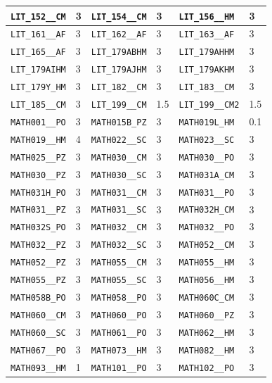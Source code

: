 \begin{longtable}{|l|l||l|l||l|l|}
    \verb|LIT_152__CM| & 3 & \verb|LIT_154__CM| & 3 & \verb|LIT_156__HM| & 3\\\hline
    \verb|LIT_161__AF| & 3 & \verb|LIT_162__AF| & 3 & \verb|LIT_163__AF| & 3\\\hline
    \verb|LIT_165__AF| & 3 & \verb|LIT_179ABHM| & 3 & \verb|LIT_179AHHM| & 3\\\hline
    \verb|LIT_179AIHM| & 3 & \verb|LIT_179AJHM| & 3 & \verb|LIT_179AKHM| & 3\\\hline
    \verb|LIT_179Y_HM| & 3 & \verb|LIT_182__CM| & 3 & \verb|LIT_183__CM| & 3\\\hline
    \verb|LIT_185__CM| & 3 & \verb|LIT_199__CM| & 1.5 & \verb|LIT_199__CM2| & 1.5\\\hline
    \verb|MATH001__PO| & 3 & \verb|MATH015B_PZ| & 3 & \verb|MATH019L_HM| & 0.1\\\hline
    \verb|MATH019__HM| & 4 & \verb|MATH022__SC| & 3 & \verb|MATH023__SC| & 3\\\hline
    \verb|MATH025__PZ| & 3 & \verb|MATH030__CM| & 3 & \verb|MATH030__PO| & 3\\\hline
    \verb|MATH030__PZ| & 3 & \verb|MATH030__SC| & 3 & \verb|MATH031A_CM| & 3\\\hline
    \verb|MATH031H_PO| & 3 & \verb|MATH031__CM| & 3 & \verb|MATH031__PO| & 3\\\hline
    \verb|MATH031__PZ| & 3 & \verb|MATH031__SC| & 3 & \verb|MATH032H_CM| & 3\\\hline
    \verb|MATH032S_PO| & 3 & \verb|MATH032__CM| & 3 & \verb|MATH032__PO| & 3\\\hline
    \verb|MATH032__PZ| & 3 & \verb|MATH032__SC| & 3 & \verb|MATH052__CM| & 3\\\hline
    \verb|MATH052__PZ| & 3 & \verb|MATH055__CM| & 3 & \verb|MATH055__HM| & 3\\\hline
    \verb|MATH055__PZ| & 3 & \verb|MATH055__SC| & 3 & \verb|MATH056__HM| & 3\\\hline
    \verb|MATH058B_PO| & 3 & \verb|MATH058__PO| & 3 & \verb|MATH060C_CM| & 3\\\hline
    \verb|MATH060__CM| & 3 & \verb|MATH060__PO| & 3 & \verb|MATH060__PZ| & 3\\\hline
    \verb|MATH060__SC| & 3 & \verb|MATH061__PO| & 3 & \verb|MATH062__HM| & 3\\\hline
    \verb|MATH067__PO| & 3 & \verb|MATH073__HM| & 3 & \verb|MATH082__HM| & 3\\\hline
    \verb|MATH093__HM| & 1 & \verb|MATH101__PO| & 3 & \verb|MATH102__PO| & 3\\\hline

\end{longtable}
